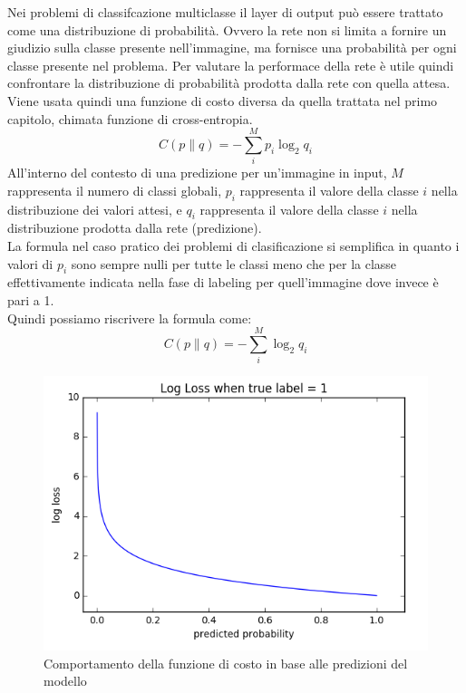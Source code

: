 \documentclass[12pt,a4paper,openright,twoside]{report}
\begin{document}
Nei problemi di classifcazione multiclasse il layer di output può essere trattato come una distribuzione di probabilità. Ovvero la rete non si limita a fornire un giudizio sulla classe presente nell'immagine, ma fornisce una probabilità per ogni classe presente nel problema.
Per valutare la performace della rete è utile quindi confrontare la distribuzione di probabilità prodotta dalla rete con quella attesa.
\newpage
Viene usata quindi una funzione di costo diversa da quella trattata nel primo capitolo, chimata funzione di cross-entropia.
\begin{equation}
    C\left(p\|q\right)=-\sum _{i}^{M}p_{i}\log _{2}q_{i}
\end{equation}
All'interno del contesto di una predizione per un'immagine in input, $M$ rappresenta il numero di classi globali, $p_{i}$ rappresenta il valore della classe $i$ nella distribuzione dei valori attesi, e $q_{i}$ rappresenta il valore della classe $i$ nella distribuzione prodotta dalla rete (predizione).\\
La formula nel caso pratico dei problemi di clasificazione si semplifica in quanto i valori di $p_{i}$ sono sempre nulli per tutte le classi meno che per la classe effettivamente indicata nella fase di labeling per quell'immagine dove invece è pari a 1. \\ Quindi possiamo riscrivere la formula come: 
\begin{equation}
    C\left(p\|q\right)=-\sum _{i}^{M}\log _{2}q_{i}
\end{equation}
\begin{figure}[h]
\centering
\includegraphics[width=\linewidth]{cross_entropy.png}
\caption{Comportamento della funzione di costo in base alle predizioni del modello}
\end{figure}
\end{document}
